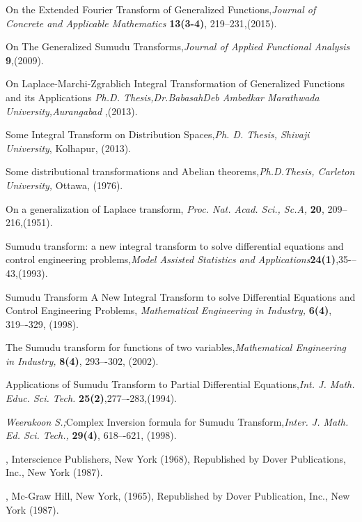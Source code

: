\begin{thebibliography}{00}
On the Extended Fourier Transform of Generalized Functions,{\it Journal of Concrete and Applicable Mathematics} {\bf 13(3-4)}, 219--231,(2015).

On The Generalized Sumudu Transforms,{\it Journal of Applied Functional Analysis} {\bf 9},(2009).

On Laplace-Marchi-Zgrablich  Integral Transformation of Generalized Functions  and its Applications {\it Ph.D. Thesis,Dr.BabasahDeb Ambedkar Marathwada University,Aurangabad },(2013).

Some Integral Transform on Distribution Spaces,{\it Ph. D. Thesis, Shivaji University}, Kolhapur, (2013).

Some distributional transformations and Abelian theorems,{\it Ph.D.Thesis, Carleton University,} Ottawa, (1976).

On a generalization of Laplace transform, {\it Proc. Nat. Acad. Sci.,
Sc.A,} {\bf 20}, 209--216,(1951).

Sumudu transform: a new integral transform to solve differential equations and control engineering problems,{\it  Model Assisted Statistics and Applications}{\bf 24(1)},35-–43,(1993).

Sumudu Transform A New Integral Transform to solve Differential Equations and Control Engineering Problems, {\it Mathematical Engineering in Industry,} {\bf 6(4)}, 319–-329, (1998).

The Sumudu transform for functions of two variables,{\it Mathematical Engineering in Industry,} {\bf 8(4)}, 293–-302, (2002).

Applications of Sumudu Transform to Partial Differential
Equations,{\it Int. J. Math. Educ. Sci. Tech.} {\bf 25(2)},277–-283,(1994).
 
 {\sl Weerakoon S.;}Complex Inversion formula for Sumudu Transform,{\it Inter. J.
Math. Ed. Sci. Tech.,} {\bf 29(4)}, 618–-621, (1998).


, Interscience Publishers, New York (1968), Republished by Dover Publications, Inc., New York (1987).

,
Mc-Graw Hill, New York, (1965), Republished by Dover Publication, Inc., New York (1987).




\end{thebibliography} 